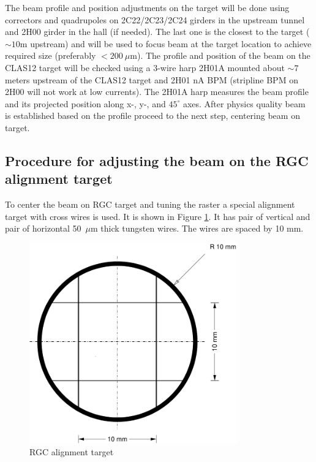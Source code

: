 The beam profile and position adjustments on the target will be done using correctors and quadrupoles on 2C22/2C23/2C24 girders in the upstream tunnel and 2H00 girder in the hall (if needed). The last one is the closest to the target ($\sim 10$m upstream) and will be used to focus beam at the target location to achieve required size (preferably $<200~\mu$m). The profile and position of the beam on the CLAS12 target will be checked using a 3-wire harp 2H01A mounted about $\sim 7$ meters upstream of the CLAS12 target and 2H01 nA BPM (stripline BPM on 2H00 will not work at low currents). The 2H01A harp measures the beam profile and its projected position along x-, y-, and $45^\circ$ axes. After physics quality beam is established based on the profile proceed to the next step, centering beam on target. 

\subsection{Procedure for adjusting the beam on the RGC alignment target} 
To center the beam on RGC target and tuning the raster a special alignment target with cross wires is used. It is shown in Figure \ref{fig:crosswires}. It has pair of vertical and pair of horizontal 50~$\mu$m thick tungsten wires. The wires are spaced by 10 mm.
\begin{figure}[htb!]
\centering
\includegraphics[width=0.8\textwidth]{RGC_alignment_target.pdf}
\caption{RGC alignment target}
\label{fig:crosswires}
\end{figure}

